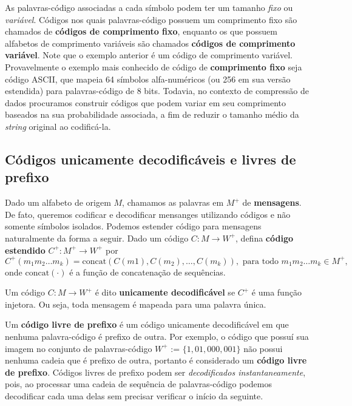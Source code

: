 As palavras-código associadas a cada símbolo podem ter um tamanho \emph{fixo} ou \emph{variável}.
Códigos nos quais palavras-código possuem um comprimento fixo são chamados de \textbf{códigos de comprimento fixo}, enquanto os que possuem alfabetos de comprimento variáveis são chamados \textbf{códigos de comprimento variável}. Note que o exemplo anterior é um código de comprimento variável. 
Provavelmente o exemplo mais conhecido de código de \textbf{comprimento fixo} seja código ASCII, que mapeia 64 símbolos alfa-numéricos (ou 256 em sua versão estendida) para palavras-código de 8 bits. 
Todavia, no contexto de compressão de dados procuramos construir códigos que podem variar em seu comprimento baseados na sua probabilidade associada, a fim de reduzir o tamanho médio da \emph{string} original ao codificá-la.

\subsection{Códigos unicamente decodificáveis e livres de prefixo}

Dado um alfabeto de origem $M$, chamamos as palavras em $M^+$ de
\textbf{mensagens}. De fato, queremos codificar e decodificar
mensanges utilizando códigos e não somente símbolos isolados. Podemos
estender código para mensagens naturalmente da forma a seguir. Dado um
código $C\colon M\to W^+$, defina \textbf{código estendido} $C^+: M^+\to W^+$ por
\begin{equation*}
  C^+(m_1m_2\dotsc m_k) =
  \textrm{concat}(C(m1),C(m_2),\dotsc,C(m_k)), \text{ para todo }m_1m_2\dotsc m_k\in M^+,
\end{equation*}
onde $\textrm{concat}(\cdot)$ é a função de concatenação de sequências.


Um código $C\colon M\to W^+$ é dito \textbf{unicamente decodificável}
se $C^+$ é uma função injetora. Ou seja, toda mensagem é mapeada para
uma palavra única.

Um \textbf{código livre de prefixo} é um código unicamente decodificável em que nenhuma palavra-código é prefixo de outra. 
Por exemplo, o código que possuí sua imagem no conjunto de palavras-código \emph{$W^+$} := $\{1, 01, 000, 001\}$ não possui nenhuma cadeia que é prefixo de outra, portanto é considerado um \textbf{código livre de prefixo}.
Códigos livres de prefixo podem ser \emph{decodificados instantaneamente}, pois, ao processar uma cadeia de sequência de palavras-código podemos decodificar cada uma delas sem precisar verificar o início da seguinte.

